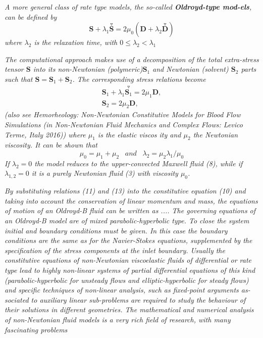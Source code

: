\documentclass[11pt,letterpaper]{article}
\begin{document}
\textit{A more general class of rate type models, the so-called \textbf{Oldroyd-type mod-els}, can be defined by
\begin{equation}
\bm{S}+ \lambda_1 \overset{\triangledown}{\bm{S}} = 2\mu_0(\bm{D}+\lambda_2\overset{\triangledown}{\bm{D}}) 
\end{equation}
where $\lambda_2$ is the relaxation time, with $0 \leq \lambda_2 <\lambda_1$}



\textit{The computational approach makes use of a decomposition of the total extra-stress tensor $\bm{S}$ into its non-Newtonian (polymeric)$\bm{S}_1$
 and Newtonian (solvent) $\bm{S}_2$ parts such that $\bm{S}=\bm{S}_1 + \bm{S}_2$. The corresponding stress relations become
\begin{align}
\bm{S}_1 +\lambda_1 \overset{\triangledown}{\bm{S}_1} = 2\mu_1\bm{D} , \\
\bm{S}_2= 2\mu_2\bm{D},
\end{align}
(also see Hemorheology: Non-Newtonian Constitutive Models for Blood Flow Simulations (in Non-Newtonian Fluid Mechanics and Complex Flows: Levico Terme, Italy 2016))
where $\mu_1$ is the elastic viscos
ity and $\mu_2$ the Newtonian viscosity. It can be shown that
\begin{equation}
\mu_0 = \mu_1 +\mu_2 \hspace{10pt} and \hspace{10pt} \lambda_2= \mu_2 \lambda_1/\mu_0
\end{equation}
If $\lambda_2 = 0$ the model reduces to the upper-convected Maxwell fluid (8), while if $\lambda_{1,2} = 0$ it is a purely Newtonian fluid (3) with viscosity $\mu_0$.
}

\textit{By substituting relations (11) and (13) into the constitutive equation (10)
and taking into account the conservation of linear momentum and mass, the equations of motion of an Oldroyd-B fluid can be written as ....  The governing equations of an Oldroyd-B model are of mixed parabolic-hyperbolic type. To close the system initial and boundary conditions must be given. In this case the boundary conditions are the same as for the
Navier-Stokes equations, supplemented by the specification of the stress
components at the inlet boundary. Usually the constitutive equations of
non-Newtonian viscoelastic fluids of differential or rate type lead to highly
non-linear systems of partial differential equations of this kind (parabolic-hyperbolic for unsteady flows and elliptic-hyperbolic for steady flows) and
specific techniques of non-linear analysis, such as fixed-point arguments as-sociated to auxiliary linear sub-problems are required to study the behaviour 
of their solutions in different geometries. The mathematical and numerical
analysis of non-Newtonian fluid models is a very rich field of research, with
many fascinating problems}
\end{document}

